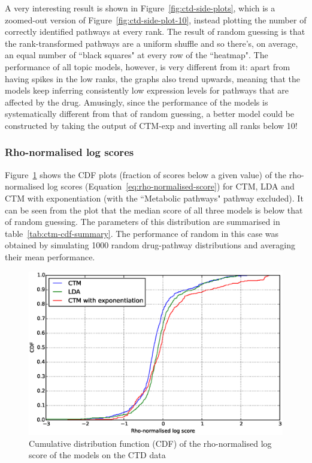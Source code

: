 \documentclass[12pt,a4paper,twoside,openright]{report}
\begin{document}
A very interesting result is shown in Figure~\ref{fig:ctd-side-plots}, which is a zoomed-out version of Figure~\ref{fig:ctd-side-plot-10}, instead plotting the number of correctly identified pathways at every rank. The result of random guessing is that the rank-transformed pathways are a uniform shuffle and so there's, on average, an equal number of ``black squares" at every row of the ``heatmap". The performance of all topic models, however, is very different from it: apart from having spikes in the low ranks, the graphs also trend upwards, meaning that the models keep inferring consistently low expression levels for pathways that are affected by the drug. Amusingly, since the performance of the models is systematically different from that of random guessing, a better model could be constructed by taking the output of CTM-exp and inverting all ranks below 10!

\subsubsection{Rho-normalised log scores}
Figure~\ref{fig:ctd-rho-cdf} shows the CDF plots (fraction of scores below a given value) of the rho-normalised log scores (Equation~\ref{eq:rho-normalised-score}) for CTM, LDA and CTM with exponentiation (with the ``Metabolic pathways" pathway excluded). It can be seen from the plot that the median score of all three models is below that of random guessing. The parameters of this distribution are summarised in table~\ref{tab:ctm-cdf-summary}. The performance of random in this case was obtained by simulating 1000 random drug-pathway distributions and averaging their mean performance.

\begin{figure}[!htb]
\includegraphics[width=\textwidth]{ctd-rho-cdf.eps}
\caption{Cumulative distribution function (CDF) of the rho-normalised log score of the models on the CTD data}
\label{fig:ctd-rho-cdf}
\end{figure}
\end{document}
